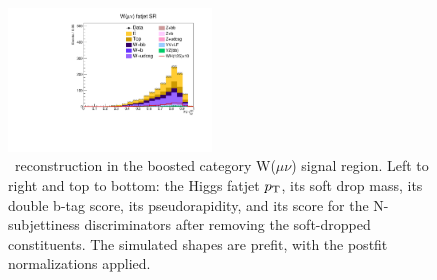 \begin{figure}[tbp]
\begin{center}
    \includegraphics[width=0.48\textwidth]{figures/wlnhbb2016/boosted/WmnWHFJSR_fj1Tau32SD.pdf}
    \caption{\HBB\ reconstruction in the boosted category W($\mu\nu$) signal region.
    Left to right and top to bottom: the Higgs fatjet $p_{\mathrm{T}}$, its soft drop mass, its
    double b-tag score, its pseudorapidity, and its score for the N-subjettiness discriminators
    after removing the soft-dropped constituents.
    The simulated shapes are prefit, with the postfit normalizations applied.}
    \label{fig:boost_WmnSR_Hbb}
  \end{center}
\end{figure}
\clearpage

